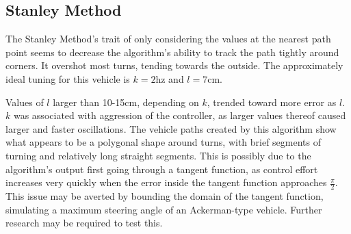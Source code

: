 \documentclass[12pt]{article}
\begin{document}
\begin{flushleft}
\begin{figure}[H]
\endminipage
\end{figure}

\subsection{Stanley Method}

The Stanley Method's trait of only considering the values at the nearest path point seems to decrease the algorithm's ability to track the path tightly around corners. It overshot most turns, tending towards the outside. The approximately ideal tuning for this vehicle is $k=2$hz and $l=7$cm.

Values of $l$ larger than 10-15cm, depending on $k$, trended toward more error as $l$. $k$ was associated with aggression of the controller, as larger values thereof caused larger and faster oscillations. The vehicle paths created by this algorithm show what appears to be a polygonal shape around turns, with brief segments of turning and relatively long straight segments. This is possibly due to the algorithm's output first going through a tangent function, as control effort increases very quickly when the error inside the tangent function approaches $\frac{\pi}{2}$. This issue may be averted by bounding the domain of the tangent function, simulating a maximum steering angle of an Ackerman-type vehicle. Further research may be required to test this.


\end{flushleft}
\end{document}
